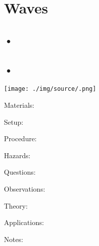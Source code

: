\section{Waves}

\begin{multicols}{2}


\section*{•}




\subsection{•}

\begin{center}
\texttt{[image: ./img/source/.png]}
\end{center}

\begin{description*}
\item[Materials:]{}
\item[Setup:]{}
\item[Procedure:]{}
\item[Hazards:]{}
\item[Questions:]{}
\item[Observations:]{}
\item[Theory:]{}
\item[Applications:]{}
\item[Notes:]{}
\end{description*}



\end{multicols}

\pagebreak